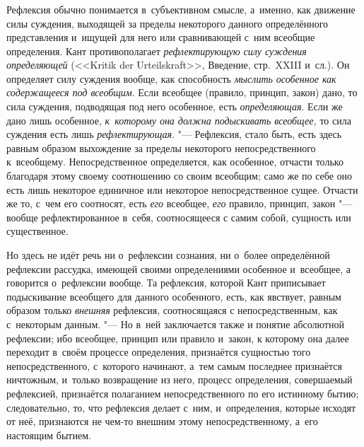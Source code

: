\subsubsection[Примечание]{}

Рефлексия обычно понимается в~субъективном смысле, а~именно, как движение
силы суждения, выходящей за пределы некоторого данного определённого
представления и~ищущей для него или сравнивающей с~ним всеобщие
определения. Кант противополагает {\em рефлектирующую
силу суждения определяющей} (<<Kritik der Urteils\-kraft>>, Введение,
стр.~XXIII и~сл.).
Он определяет силу суждения вообще, как способность
{\em мыслить особенное как содержащееся под всеобщим}.
Если всеобщее (правило, принцип, закон) дано, то сила суждения, подводящая
под него особенное, есть {\em определяющая}. Если же
дано лишь особенное, {\em к~которому она должна
подыскивать всеобщее,} то сила суждения есть лишь
{\em рефлектирующая}.
"--- Рефлексия, стало быть, есть здесь равным образом выхождение за пределы
некоторого непосредственного к~всеобщему. Непосредственное определяется,
как особенное, отчасти только благодаря этому своему соотношению со своим
всеобщим; само же по себе оно есть лишь некоторое единичное или некоторое
непосредственное сущее. Отчасти же то, с~чем его соотносят, есть
{\em его} всеобщее, {\em его}
правило, принцип, закон "--- вообще рефлектированное в~себя, соотносящееся с
самим собой, сущность или существенное.

Но здесь не идёт речь ни о~рефлексии сознания, ни о~более определённой
рефлексии рассудка, имеющей своими определениями особенное и~всеобщее, а
говорится о~рефлексии вообще. Та рефлексия, которой Кант приписывает
подыскивание всеобщего для данного особенного, есть, как явствует, равным
образом только {\em внешняя} рефлексия, соотносящаяся с
непосредственным, как с~некоторым данным. "--- Но в~ней заключается также и
понятие абсолютной рефлексии; ибо всеобщее, принцип или правило и~закон, к
которому она далее переходит в~своём процессе определения, признаётся
сущностью того непосредственного, с~которого начинают, а~тем самым
последнее признаётся ничтожным, и~только возвращение из него, процесс
определения, совершаемый рефлексией, признаётся полаганием
непосредственного по его истинному бытию; следовательно, то, что рефлексия
делает с~ним, и~определения, которые исходят от неё, признаются не чем-то
внешним этому непосредственному, а~его настоящим бытием.

